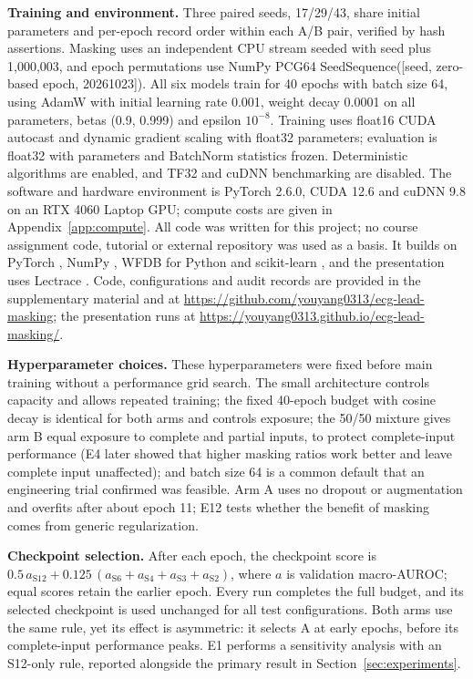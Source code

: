 \textbf{Training and environment.} Three paired seeds, 17/29/43, share initial parameters and per-epoch record order within each A/B pair, verified by hash assertions. Masking uses an independent CPU stream seeded with seed plus 1,000,003, and epoch permutations use NumPy PCG64 SeedSequence([seed, zero-based epoch, 20261023]). All six models train for 40 epochs with batch size 64, using AdamW with initial learning rate 0.001, weight decay 0.0001 on all parameters, betas (0.9, 0.999) and epsilon $10^{-8}$. Training uses float16 CUDA autocast and dynamic gradient scaling with float32 parameters; evaluation is float32 with parameters and BatchNorm statistics frozen. Deterministic algorithms are enabled, and TF32 and cuDNN benchmarking are disabled. The software and hardware environment is PyTorch 2.6.0, CUDA 12.6 and cuDNN 9.8 on an RTX 4060 Laptop GPU; compute costs are given in Appendix~\ref{app:compute}. All code was written for this project; no course assignment code, tutorial or external repository was used as a basis. It builds on PyTorch \citep{paszke2019pytorch}, NumPy \citep{harris2020numpy}, WFDB for Python \citep{xie2023wfdb} and scikit-learn \citep{pedregosa2011sklearn}, and the presentation uses Lectrace \citep{adesanmi2026lectrace}. Code, configurations and audit records are provided in the supplementary material and at \url{https://github.com/youyang0313/ecg-lead-masking}; the presentation runs at \url{https://youyang0313.github.io/ecg-lead-masking/}.

\textbf{Hyperparameter choices.} These hyperparameters were fixed before main training without a performance grid search. The small architecture controls capacity and allows repeated training; the fixed 40-epoch budget with cosine decay is identical for both arms and controls exposure; the 50/50 mixture gives arm B equal exposure to complete and partial inputs, to protect complete-input performance (E4 later showed that higher masking ratios work better and leave complete input unaffected); and batch size 64 is a common default that an engineering trial confirmed was feasible. Arm A uses no dropout or augmentation and overfits after about epoch 11; E12 tests whether the benefit of masking comes from generic regularization.

\textbf{Checkpoint selection.} After each epoch, the checkpoint score is $0.5\,a_{\mathrm{S12}}+0.125\,(a_{\mathrm{S6}}+a_{\mathrm{S4}}+a_{\mathrm{S3}}+a_{\mathrm{S2}})$, where $a$ is validation macro-AUROC; equal scores retain the earlier epoch. Every run completes the full budget, and its selected checkpoint is used unchanged for all test configurations. Both arms use the same rule, yet its effect is asymmetric: it selects A at early epochs, before its complete-input performance peaks. E1 performs a sensitivity analysis with an S12-only rule, reported alongside the primary result in Section~\ref{sec:experiments}.

